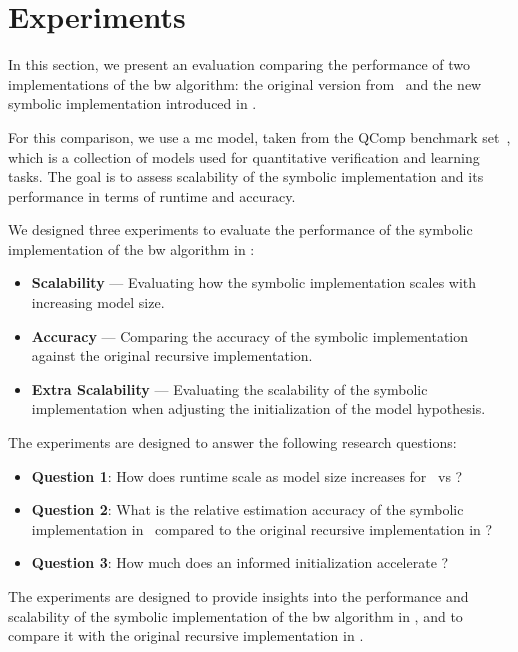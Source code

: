 \section{Experiments}\label{sec:experiments}
In this section, we present an evaluation comparing the performance of two implementations of the \gls{bw} algorithm: the original version from \Jajapy\ and the new symbolic implementation introduced in \JajapyTwo.

For this comparison, we use a \gls{mc} model, taken from the QComp benchmark set~\cite{hartmanns2019quantitative}, which is a collection of models used for quantitative verification and learning tasks.
The goal is to assess scalability of the symbolic implementation and its performance in terms of runtime and accuracy.

We designed three experiments to evaluate the performance of the symbolic implementation of the \gls{bw} algorithm in \JajapyTwo:


\begin{itemize}
    \item \textbf{Scalability} — Evaluating how the symbolic implementation scales with increasing model size.
    \item \textbf{Accuracy} — Comparing the accuracy of the symbolic implementation against the original recursive implementation.
    \item \textbf{Extra Scalability} — Evaluating the scalability of the symbolic implementation when adjusting the initialization of the model hypothesis.
\end{itemize}


The experiments are designed to answer the following research questions:


\begin{itemize}
    \item \textbf{Question 1}: How does runtime scale as model size increases for \JajapyTwo\ vs \Jajapy?
    \item \textbf{Question 2}: What is the relative estimation accuracy of the symbolic implementation in \JajapyTwo\ compared to the original recursive implementation in \Jajapy?
    \item \textbf{Question 3}: How much does an informed initialization accelerate \JajapyTwo?
\end{itemize}


The experiments are designed to provide insights into the performance and scalability of the symbolic implementation of the \gls{bw} algorithm in \JajapyTwo, and to compare it with the original recursive implementation in \Jajapy.


